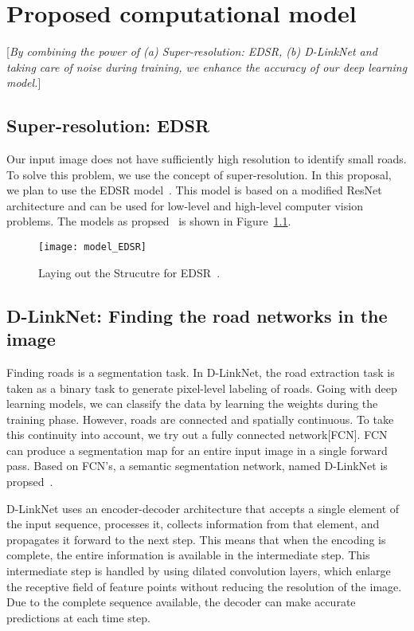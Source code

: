 \chapter{Proposed computational model}\label{chapt:model}
[\textit{By combining the power of (a) Super-resolution: EDSR, (b) D-LinkNet and taking care of noise during training, we enhance the accuracy of our deep learning model.}]

\section{Super-resolution: EDSR}
Our input image does not have sufficiently high resolution to identify small roads. To solve this problem, we use the concept of super-resolution. In this proposal, we plan to use the EDSR model~\cite{EDSR}. This model is based on a modified ResNet architecture and can be used for low-level and high-level computer vision problems. The models as propsed~\cite{EDSR} is shown in Figure~\ref{fig:model_EDSR}.

\begin{figure}[h!]
  \centering
  \texttt{[image: model\_EDSR]}
  \caption{Laying out the Strucutre for EDSR~\cite{EDSR}.}
  \label{fig:model_EDSR}
\end{figure}

\section{D-LinkNet: Finding the road networks in the image}
Finding roads is a segmentation task. In D-LinkNet, the road extraction task is taken as a binary task to generate pixel-level labeling of roads. Going with deep learning models, we can classify the data by learning the weights during the training phase. However, roads are connected and spatially continuous. To take this continuity into account, we try out a fully connected network[FCN]. FCN can produce a segmentation map for an entire input image in a single forward pass. Based on FCN's, a semantic segmentation network, named D-LinkNet is propsed~\cite{D-LinkNet}.

D-LinkNet uses an encoder-decoder architecture that accepts a single element of the input sequence, processes it, collects information from that element, and propagates it forward to the next step. This means that when the encoding is complete, the entire information is available in the intermediate step. This intermediate step is handled by using dilated convolution layers, which enlarge the receptive field of feature points without reducing the resolution of the image. Due to the complete sequence available, the decoder can make accurate predictions at each time step.

